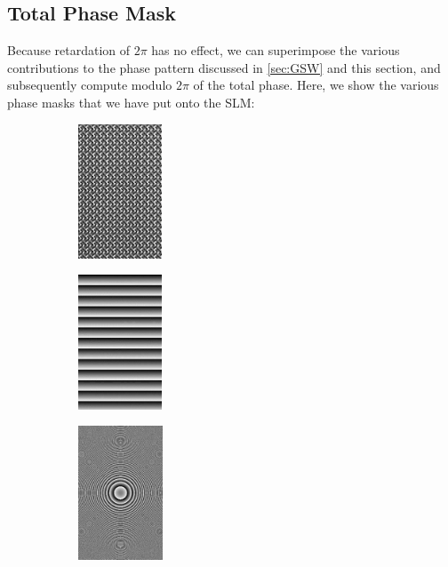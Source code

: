 \subsection{Total Phase Mask}

Because retardation of $2\pi$ has no effect, we can superimpose the various contributions to the phase pattern discussed in \cref{sec:GSW} and this section, and subsequently compute modulo $2\pi$ of the total phase. 
Here, we show the various phase masks that we have put onto the SLM:

\begin{figure}
	\begin{subfigure}{.18\linewidth}
		\centering
		\includegraphics[height=4cm]{figures/SLMphase/array.jpg}
		\caption{}
		\label{fig:Array}
	\end{subfigure}
	\begin{subfigure}{.18\linewidth}
		\centering
		\includegraphics[height=4cm]{figures/SLMphase/linear.jpg}
		\caption{}
		\label{fig:Linear}
	\end{subfigure}
	\begin{subfigure}{.18\linewidth}
		\centering
		\includegraphics[height=4cm]{figures/SLMphase/lens.jpg}
		\caption{}
		\label{fig:Lens}
	\end{subfigure}	
	\begin{subfigure}{.18\linewidth}

\end{subfigure}
\end{figure}
